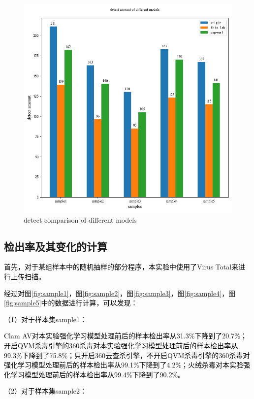 \begin{figure}[htbp]
  \centering
  \includegraphics[scale=0.6]{images/compare_with_different_model.png}
  \caption{detect comparison of different models}\label{fig:compare_with_different_model}
\end{figure}
\subsection{检出率及其变化的计算}

\textcolor{black}{首先，对于某组样本中的随机抽样的部分程序，本实验中使用了Virus Total来进行上传扫描。}

\textcolor{black}{经过对图\ref{fig:sample1}，图\ref{fig:sample2}，图\ref{fig:sample3}，图\ref{fig:sample4}，图\ref{fig:sample5}中的数据进行计算，可以发现：}

\textcolor{black}{（1）对于样本集sample1：}

\textcolor{black}{Clam AV对本实验强化学习模型处理前后的样本检出率从31.3\%下降到了20.7\%；开启QVM杀毒引擎的360杀毒对本实验强化学习模型处理前后的样本检出率从99.3\%下降到了75.8\%；只开启360云查杀引擎，不开启QVM杀毒引擎的360杀毒对强化学习模型处理前后的样本检出率从99.1\%下降到了4.2\%；火绒杀毒对本实验强化学习模型处理前后的样本检出率从99.4\%下降到了90.2\%。}

\textcolor{black}{（2）对于样本集sample2：}

